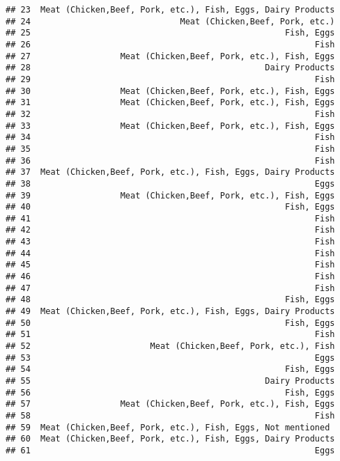 \documentclass[
]{article}
\begin{document}
\begin{verbatim}
## 23  Meat (Chicken,Beef, Pork, etc.), Fish, Eggs, Dairy Products
## 24                              Meat (Chicken,Beef, Pork, etc.)
## 25                                                   Fish, Eggs
## 26                                                         Fish
## 27                  Meat (Chicken,Beef, Pork, etc.), Fish, Eggs
## 28                                               Dairy Products
## 29                                                         Fish
## 30                  Meat (Chicken,Beef, Pork, etc.), Fish, Eggs
## 31                  Meat (Chicken,Beef, Pork, etc.), Fish, Eggs
## 32                                                         Fish
## 33                  Meat (Chicken,Beef, Pork, etc.), Fish, Eggs
## 34                                                         Fish
## 35                                                         Fish
## 36                                                         Fish
## 37  Meat (Chicken,Beef, Pork, etc.), Fish, Eggs, Dairy Products
## 38                                                         Eggs
## 39                  Meat (Chicken,Beef, Pork, etc.), Fish, Eggs
## 40                                                   Fish, Eggs
## 41                                                         Fish
## 42                                                         Fish
## 43                                                         Fish
## 44                                                         Fish
## 45                                                         Fish
## 46                                                         Fish
## 47                                                         Fish
## 48                                                   Fish, Eggs
## 49  Meat (Chicken,Beef, Pork, etc.), Fish, Eggs, Dairy Products
## 50                                                   Fish, Eggs
## 51                                                         Fish
## 52                        Meat (Chicken,Beef, Pork, etc.), Fish
## 53                                                         Eggs
## 54                                                   Fish, Eggs
## 55                                               Dairy Products
## 56                                                   Fish, Eggs
## 57                  Meat (Chicken,Beef, Pork, etc.), Fish, Eggs
## 58                                                         Fish
## 59  Meat (Chicken,Beef, Pork, etc.), Fish, Eggs, Not mentioned 
## 60  Meat (Chicken,Beef, Pork, etc.), Fish, Eggs, Dairy Products
## 61                                                         Eggs

\end{verbatim}
\end{document}
